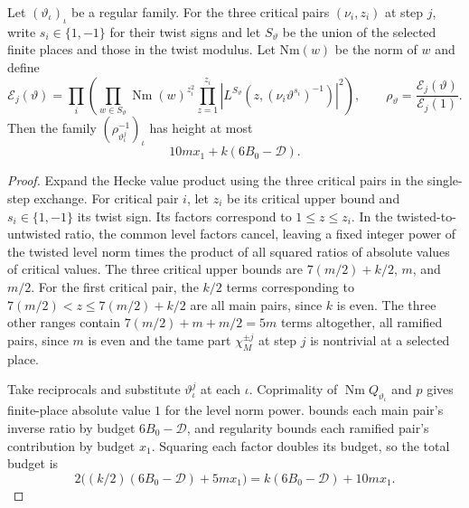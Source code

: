 \begin{lemma}
\label{lem:c-hecke-product-height}
\emitthmsource
Let $(\vartheta_\iota)_\iota$ be a regular family. For the three critical pairs $(\nu_i,z_i)$ at step $j$, write $s_i\in\{1,-1\}$ for their twist signs and let $S_\vartheta$ be the union of the selected finite places and those in the twist modulus. Let $\mathrm{Nm}(w)$ be the norm of $w$ and define
\[
 \mathcal E_j(\vartheta)=\prod_i
 \left(\prod_{w\in S_\vartheta}\operatorname{Nm}(w)^{z_i^2}
       \prod_{z=1}^{z_i}|L^{S_\vartheta}(z,(\nu_i\vartheta^{s_i})^{-1})|^2\right),
 \qquad \rho_\vartheta=\frac{\mathcal E_j(\vartheta)}{\mathcal E_j(1)}.
\]
Then the family $(\rho_{\vartheta_\iota^j}^{-1})_\iota$ has height at most
\[
 10mx_1+k(6B_0-\mathcal D).
\]
\end{lemma}
\begin{proof}
Expand the Hecke value product using the three critical pairs in the single-step exchange. For critical pair $i$, let $z_i$ be its critical upper bound and $s_i\in\{1,-1\}$ its twist sign. Its factors correspond to $1\le z\le z_i$. In the twisted-to-untwisted ratio, the common level factors cancel, leaving a fixed integer power of the twisted level norm times the product of all squared ratios of absolute values of critical values. The three critical upper bounds are $7(m/2)+k/2$, $m$, and $m/2$. For the first critical pair, the $k/2$ terms corresponding to $7(m/2)<z\le7(m/2)+k/2$ are all main pairs, since $k$ is even. The three other ranges contain $7(m/2)+m+m/2=5m$ terms altogether, all ramified pairs, since $m$ is even and the tame part $\chi_M^{\pm j}$ at step $j$ is nontrivial at a selected place.

Take reciprocals and substitute $\vartheta_\iota^j$ at each $\iota$. Coprimality of $\operatorname{Nm}Q_{\vartheta_\iota}$ and $p$ gives finite-place absolute value $1$ for the level norm power.  bounds each main pair's inverse ratio by budget $6B_0-\mathcal D$, and regularity bounds each ramified pair's contribution by budget $x_1$. Squaring each factor doubles its budget, so the total budget is
\[
 2\bigl((k/2)(6B_0-\mathcal D)+5mx_1\bigr)
 =k(6B_0-\mathcal D)+10mx_1 .
\]
\end{proof}

